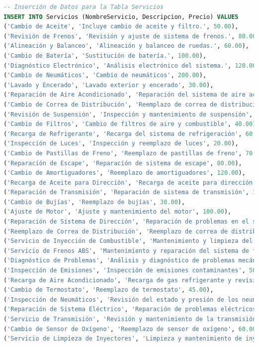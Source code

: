 \documentclass[12pt]{article}
\begin{document}
\begin{lstlisting}[language=SQL]
-- Inserción de Datos para la Tabla Servicios
INSERT INTO Servicios (NombreServicio, Descripcion, Precio) VALUES
('Cambio de Aceite', 'Incluye cambio de aceite y filtro.', 50.00),
('Revisión de Frenos', 'Revisión y ajuste de sistema de frenos.', 80.00),
('Alineación y Balanceo', 'Alineación y balanceo de ruedas.', 60.00),
('Cambio de Batería', 'Sustitución de batería.', 100.00),
('Diagnóstico Electrónico', 'Análisis electrónico del sistema.', 120.00),
('Cambio de Neumáticos', 'Cambio de neumáticos', 200.00),
('Lavado y Encerado', 'Lavado exterior y encerado', 30.00),
('Reparación de Aire Acondicionado', 'Reparación del sistema de aire acondicionado', 150.00),
('Cambio de Correa de Distribución', 'Reemplazo de correa de distribución', 90.00),
('Revisión de Suspensión', 'Inspección y mantenimiento de suspensión', 75.00),
('Cambio de Filtros', 'Cambio de filtros de aire y combustible', 40.00),
('Recarga de Refrigerante', 'Recarga del sistema de refrigeración', 60.00),
('Inspección de Luces', 'Inspección y reemplazo de luces', 20.00),
('Cambio de Pastillas de Freno', 'Reemplazo de pastillas de freno', 70.00),
('Reparación de Escape', 'Reparación de sistema de escape', 80.00),
('Cambio de Amortiguadores', 'Reemplazo de amortiguadores', 120.00),
('Recarga de Aceite para Dirección', 'Recarga de aceite para dirección', 25.00),
('Reparación de Transmisión', 'Reparación de sistema de transmisión', 180.00),
('Cambio de Bujías', 'Reemplazo de bujías', 30.00),
('Ajuste de Motor', 'Ajuste y mantenimiento del motor', 100.00),
('Reparación de Sistema de Dirección', 'Reparación de problemas en el sistema de dirección', 99.99),
('Reemplazo de Correa de Distribución', 'Reemplazo de correa de distribución y ajuste', 129.99),
('Servicio de Inyección de Combustible', 'Mantenimiento y limpieza del sistema de inyección', 69.99),
('Servicio de Frenos ABS', 'Mantenimiento y reparación del sistema de frenos ABS', 109.99),
('Diagnóstico de Problemas', 'Análisis y diagnóstico de problemas mecánicos', 49.99),
('Inspección de Emisiones', 'Inspección de emisiones contaminantes', 50.00),
('Recarga de Aire Acondicionado', 'Recarga de gas refrigerante y revisión del sistema de aire acondicionado', 69.99),
('Cambio de Termostato', 'Reemplazo de termostato', 45.00),
('Inspección de Neumáticos', 'Revisión del estado y presión de los neumáticos', 30.00),
('Reparación de Sistema Eléctrico', 'Reparación de problemas eléctricos', 120.00),
('Servicio de Transmisión', 'Revisión y mantenimiento de la transmisión', 159.99),
('Cambio de Sensor de Oxígeno', 'Reemplazo de sensor de oxígeno', 60.00),
('Servicio de Limpieza de Inyectores', 'Limpieza y mantenimiento de inyectores', 80.00);


\end{lstlisting}
\end{document}
